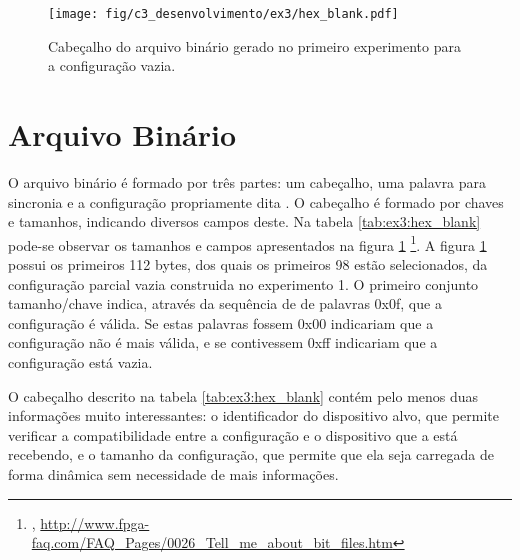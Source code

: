 \documentclass[11pt,a4paper,oneside]{book}
\begin{document}
\begin{figure}[htp]
\centering
\texttt{[image: fig/c3\_desenvolvimento/ex3/hex\_blank.pdf]}
\caption{Cabeçalho do arquivo binário gerado no primeiro experimento para a configuração vazia.}
\label{fig:ex3:hex_blank}
\end{figure}

\section{Arquivo Binário}
\label{sec:binario}
O arquivo binário é formado por três partes: um cabeçalho, uma palavra para sincronia e a configuração propriamente dita \cite{ug470, xapp583}.
O cabeçalho é formado por chaves e tamanhos, indicando diversos campos deste.
Na tabela \ref{tab:ex3:hex_blank} pode-se observar os tamanhos e campos apresentados na figura \ref{fig:ex3:hex_blank} \footnote{, \url{http://www.fpga-faq.com/FAQ_Pages/0026_Tell_me_about_bit_files.htm}}.
A figura \ref{fig:ex3:hex_blank} possui os primeiros 112 bytes, dos quais os primeiros 98 estão selecionados, da configuração parcial vazia construida no experimento 1.
O primeiro conjunto tamanho/chave indica, através da sequência de de palavras 0x0f, que a configuração é válida.
Se estas palavras fossem 0x00 indicariam que a configuração não é mais válida, e se contivessem 0xff indicariam que a configuração está vazia.

O cabeçalho descrito na tabela \ref{tab:ex3:hex_blank} contém pelo menos duas informações muito interessantes: o identificador do dispositivo alvo, que permite verificar a compatibilidade entre a configuração e o dispositivo que a está recebendo, e o tamanho da configuração, que permite que ela seja carregada de forma dinâmica sem necessidade de mais informações.
\end{document}
